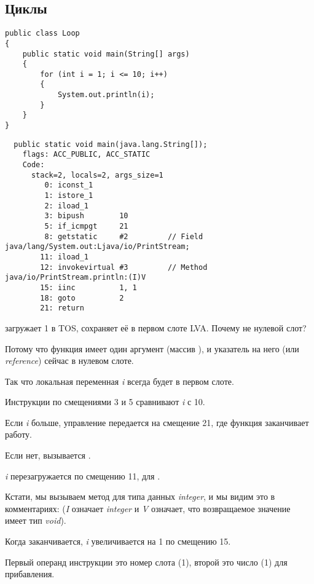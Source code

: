\subsection{Циклы}

\begin{lstlisting}[style=customjava]
public class Loop
{
	public static void main(String[] args)
	{ 
		for (int i = 1; i <= 10; i++)
		{
			System.out.println(i); 
		}               
	}
}
\end{lstlisting}

\begin{lstlisting}
  public static void main(java.lang.String[]);
    flags: ACC_PUBLIC, ACC_STATIC
    Code:
      stack=2, locals=2, args_size=1
         0: iconst_1      
         1: istore_1      
         2: iload_1       
         3: bipush        10
         5: if_icmpgt     21
         8: getstatic     #2         // Field java/lang/System.out:Ljava/io/PrintStream;
        11: iload_1       
        12: invokevirtual #3         // Method java/io/PrintStream.println:(I)V
        15: iinc          1, 1
        18: goto          2
        21: return        
\end{lstlisting}


 загружает 1 в \ac{TOS},  сохраняет её в первом слоте \ac{LVA}.
Почему не нулевой слот?

Потому что функция \main имеет один аргумент (массив ),
и указатель на него (или \emph{reference}) сейчас в нулевом слоте.


Так что локальная переменная \emph{i} всегда будет в первом слоте.


Инструкции по смещениями 3 и 5 сравнивают \emph{i} с 10.

Если \emph{i} больше, управление передается на смещение 21, где функция заканчивает работу.

Если нет, вызывается .

\emph{i} перезагружается по смещению 11, для .

Кстати, мы вызываем метод  для типа данных \emph{integer}, 
и мы видим это в комментариях: 
(\emph{I} означает \emph{integer} и \emph{V} означает, что возвращаемое значение имеет тип \emph{void}).


Когда  заканчивается, \emph{i} увеличивается на 1 по смещению 15.

Первый операнд инструкции это номер слота (1), 
второй это число (1) для прибавления.


